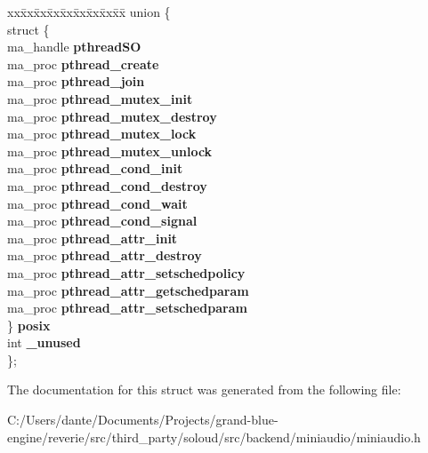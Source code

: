 \begin{DoxyCompactItemize}
\begin{tabbing}
\end{tabbing}\item 
\mbox{\label{structma__context_af63fd02e2ae6f6eb12cacc4ff65f31c6}} 
\begin{tabbing}
xx\=xx\=xx\=xx\=xx\=xx\=xx\=xx\=xx\=\kill
union \{\\
\>struct \{\\
\>\>ma\_handle {\bfseries pthreadSO}\\
\>\>ma\_proc {\bfseries pthread\_create}\\
\>\>ma\_proc {\bfseries pthread\_join}\\
\>\>ma\_proc {\bfseries pthread\_mutex\_init}\\
\>\>ma\_proc {\bfseries pthread\_mutex\_destroy}\\
\>\>ma\_proc {\bfseries pthread\_mutex\_lock}\\
\>\>ma\_proc {\bfseries pthread\_mutex\_unlock}\\
\>\>ma\_proc {\bfseries pthread\_cond\_init}\\
\>\>ma\_proc {\bfseries pthread\_cond\_destroy}\\
\>\>ma\_proc {\bfseries pthread\_cond\_wait}\\
\>\>ma\_proc {\bfseries pthread\_cond\_signal}\\
\>\>ma\_proc {\bfseries pthread\_attr\_init}\\
\>\>ma\_proc {\bfseries pthread\_attr\_destroy}\\
\>\>ma\_proc {\bfseries pthread\_attr\_setschedpolicy}\\
\>\>ma\_proc {\bfseries pthread\_attr\_getschedparam}\\
\>\>ma\_proc {\bfseries pthread\_attr\_setschedparam}\\
\>\} {\bfseries posix}\\
\>int {\bfseries \_unused}\\
\}; \\

\end{tabbing}\end{DoxyCompactItemize}


The documentation for this struct was generated from the following file\+:\begin{DoxyCompactItemize}
\item 
C\+:/\+Users/dante/\+Documents/\+Projects/grand-\/blue-\/engine/reverie/src/third\+\_\+party/soloud/src/backend/miniaudio/miniaudio.\+h\end{DoxyCompactItemize}
